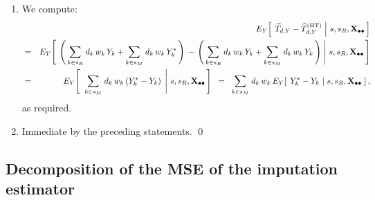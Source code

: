 \begin{enumerate}
\begin{eqnarray*}
    & = &
        E_{SR}\!\left(\,
            \overset{{\color{white}.}}{E_{Y}\!\left[\;
                \left.
                \widetilde{T}_{d,Y} \overset{{\color{white}.}}{-} \widehat{T}^{\textnormal{(HT)}}_{d,Y}
                \;\right\vert\,
                s,s_{R},\Xobs
                \,\right]}
            \;\right),
    \end{eqnarray*}
    as required.
\item
    We compute:
    \begin{eqnarray*}
    &&
        E_{Y}\!\left[\;
            \left.
            \widetilde{T}_{d,Y} \overset{{\color{white}.}}{-} \widehat{T}^{\textnormal{(HT)}}_{d,Y}
            \;\right\vert\,
            s,s_{R},\Xobs
            \,\right]
    \\
    & = &
        E_{Y}\!\left[\;
            \left.
            \left(\,
                \underset{k \in s_{R}}{\sum}\;d_{k}\,w_{k}\,Y_{k}
                \overset{{\color{white}.}}{+}
                \underset{k \in s_{M}}{\sum}\;d_{k}\,w_{k}\,Y_{k}^{*}
                \,\right)
            \,\overset{{\color{white}.}}{-}\,
            \left(\,
                \underset{k \in s_{R}}{\sum}\;d_{k}\,w_{k}\,Y_{k}
                \overset{{\color{white}.}}{+}
                \underset{k \in s_{M}}{\sum}\;d_{k}\,w_{k}\,Y_{k}
                \,\right)
            \;\right\vert\,
            s,s_{R},\Xobs
            \,\right]
    \\
    & = &
        E_{Y}\!\left[\;\,
            \left.
            \underset{k \in s_{M}}{\sum}\;d_{k}\,w_{k}\,(Y_{k}^{*}-Y_{k})
            \;\,\right\vert\,
            s,s_{R},\Xobs
            \,\right]
    \;\; = \;\;
        \underset{k \in s_{M}}{\sum}\;d_{k}\,w_{k}\,
        E_{Y}\!\left[\;\,
            Y_{k}^{*}-Y_{k}
            \,\left\vert\;
            s,s_{R},\Xobs
            \right.
            \,\right],
    \end{eqnarray*}
    as required.
\item
    Immediate by the preceding statements.
    \qed
\end{enumerate}


\vskip 1.0cm
\subsection{Decomposition of the MSE of the imputation estimator}
\setcounter{theorem}{0}


